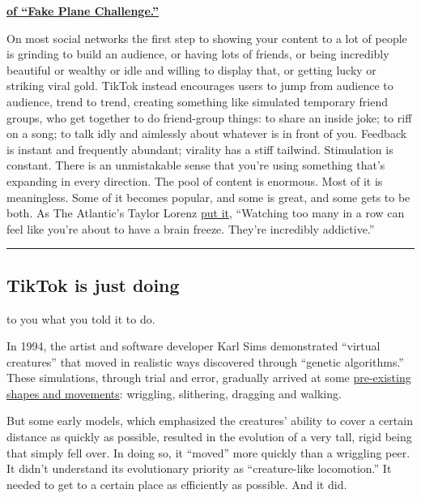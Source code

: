 \textbf{\href{https://www.tiktok.com/share/video/6652983964904459522}{of
``Fake Plane Challenge.''}}

On most social networks the first step to showing your content to a lot
of people is grinding to build an audience, or having lots of friends,
or being incredibly beautiful or wealthy or idle and willing to display
that, or getting lucky or striking viral gold. TikTok instead encourages
users to jump from audience to audience, trend to trend, creating
something like simulated temporary friend groups, who get together to do
friend-group things: to share an inside joke; to riff on a song; to talk
idly and aimlessly about whatever is in front of you. Feedback is
instant and frequently abundant; virality has a stiff tailwind.
Stimulation is constant. There is an unmistakable sense that you're
using something that's expanding in every direction. The pool of content
is enormous. Most of it is meaningless. Some of it becomes popular, and
some is great, and some gets to be both. As The Atlantic's Taylor Lorenz
\href{https://www.theatlantic.com/technology/archive/2018/10/what-tiktok-is-cringey-and-thats-fine/573871/}{put
it}, ``Watching too many in a row can feel like you're about to have a
brain freeze. They're incredibly addictive.''

\begin{center}\rule{0.5\linewidth}{\linethickness}\end{center}

\hypertarget{tiktok-is-just-doing}{%
\subsection{TikTok is just doing}\label{tiktok-is-just-doing}}

to you what you told it to do.

In 1994, the artist and software developer Karl Sims demonstrated
``virtual creatures'' that moved in realistic ways discovered through
``genetic algorithms.'' These simulations, through trial and error,
gradually arrived at some
\href{https://www.youtube.com/watch?v=JBgG_VSP7f8}{pre-existing shapes
and movements}: wriggling, slithering, dragging and walking.

But some early models, which emphasized the creatures' ability to cover
a certain distance as quickly as possible, resulted in the evolution of
a very tall, rigid being that simply fell over. In doing so, it
``moved'' more quickly than a wriggling peer. It didn't understand its
evolutionary priority as ``creature-like locomotion.'' It needed to get
to a certain place as efficiently as possible. And it did.

